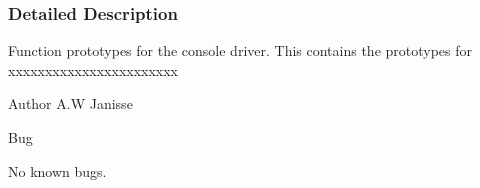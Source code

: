 \subsubsection{Detailed Description}
Function prototypes for the console driver. This contains the prototypes for xxxxxxxxxxxxxxxxxxxxxxx

\begin{DoxyAuthor}{Author}
A.\-W Janisse 
\end{DoxyAuthor}
\begin{DoxyRefDesc}{Bug}
\item[{\bf Bug}]No known bugs. \end{DoxyRefDesc}
